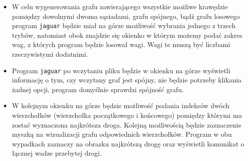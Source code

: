 \documentclass[]{article}
\begin{document}
\begin{itemize}
\begin{equation*}
\xymatrix@C=3cm{
  0 \ar[r]|{0,88435} \ar@<-2pt>[d]_{1,3444} & 1 \ar@<-2pt>[d]_{1,21111} \ar[r]|{0,2342}\ar@<-6pt>[l]|{1,12121} & 2 \ar@<-4pt>[d]_{0,2883}\ar@<-6pt>[l]|{0,76883}\\
   3\ar@<-2pt>[u]_{0,79887} \ar[r]|{1,3496}   & 4 \ar@<-2pt>[u]_{1,76344} \ar@<-0pt>[r]|{0,1323} \ar@<-6pt>[l]|{1,8677} & 5 \ar@<-6pt>[l]|{1,2932} \ar@<-2pt>[u]_{1,12312}
}
\end{equation*}
\begin{center}
(rys. 1)
\end{center}
\item
W celu wygenerowania grafu zawierającego wszystkie możliwe krawędzie pomiędzy dowolnymi dwoma sąsiadami, grafu spójnego, bądź grafu losowego program \texttt{jaguar} będzie miał na górze możliwość wybrania jednego z trzech trybów, natomiast obok znajdzie się okienko w którym możemy podać zakres wag, z których program będzie losował wagi.
Wagi te muszą być liczbami rzeczywistymi dodatnimi.
\item
Program \texttt{jaguar} po wczytaniu pliku będzie w okienku na górze wyświetli informację o tym, czy wczytany graf jest spójny, nie będzie potrzeby klikania żadnej opcji, program domyślnie sprawdzi spójność grafu.
\item
W kolejnym okienku na górze będzie możliwość podania indeksów dwóch wierzchołków (wierzchołka początkowego i końcowego) pomiędzy którymi ma zostać wyznaczona najkrótsza droga. Kolejną możliwością będzie zaznaczenie myszką na wizualizacji grafu odpowiednich wierzchołków. Program w obu wypadkach zaznaczy na obrazku najkrótszą drogę oraz wyświetli komunikat o łącznej wadze przebytej drogi.

\end{itemize}
\end{document}
